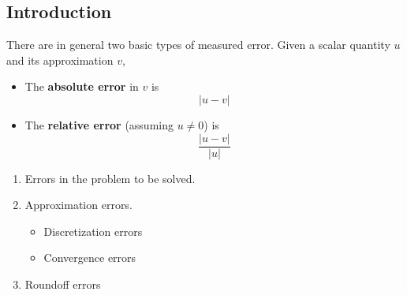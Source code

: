 \subsection{Introduction}\label{e9ba7e3}

\label{f5e280f}

There are in general two basic types of measured error. Given a scalar quantity
$u$ and its approximation $v$,
\begin{itemize}
  \item The \textbf{absolute error} in $v$ is
        $$
          |u-v|
        $$
  \item The \textbf{relative error} (assuming $u\neq0$) is
        $$
          \frac{|u-v|}{|u|}
        $$
\end{itemize}

\label{ea8dcdd}

\begin{enumerate}
  \item Errors in the problem to be solved.
  \item Approximation errors.
        \begin{itemize}
          \item Discretization errors
          \item Convergence errors
        \end{itemize}
  \item Roundoff errors
\end{enumerate}
